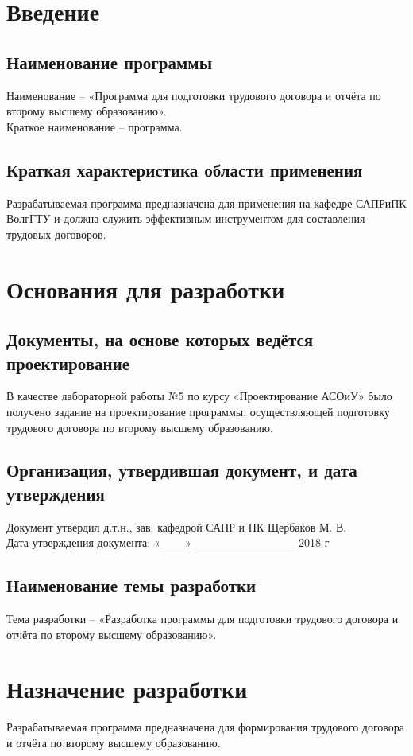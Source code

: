 \documentclass{article}
\begin{document}
 
\tableofcontents
\newpage

\section{Введение}
    \subsection{Наименование программы}
    Наименование – «Программа для подготовки трудового договора и отчёта по второму высшему образованию». \\Краткое наименование – программа.
    \subsection{Краткая характеристика области применения}
    Разрабатываемая программа предназначена для применения на кафедре САПРиПК ВолгГТУ и должна служить эффективным инструментом для составления трудовых договоров.
 
\section{Основания для разработки}
    \subsection{Документы, на основе которых ведётся проектирование}
    В качестве лабораторной работы №5 по курсу «Проектирование АСОиУ» было получено задание на проектирование программы, осуществляющей подготовку трудового договора по второму высшему образованию.
    \subsection{Организация, утвердившая документ, и дата утверждения}
    Документ утвердил д.т.н., зав. кафедрой САПР и ПК Щербаков М. В.\\
    Дата утверждения документа: «___» ____________ 2018 г
    \subsection{Наименование темы разработки}
    Тема разработки – «Разработка программы для подготовки трудового договора и отчёта по второму высшему образованию».
    
\section{Назначение разработки}
Разрабатываемая программа предназначена для формирования трудового договора и отчёта по второму высшему образованию.
\end{document}
